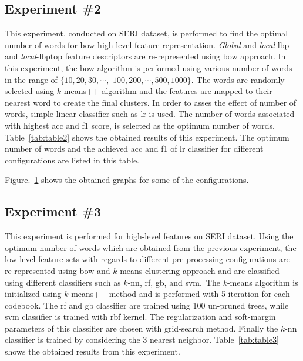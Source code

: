 \subsection{Experiment \#2}
This experiment, conducted on SERI dataset, is performed to find the optimal number of words for \ac{bow} high-level feature representation.
\emph{Global} and \emph{local}-\ac{lbp} and \emph{local}-\ac{lbptop} feature descriptors are re-represented using \ac{bow} approach.
In this experiment, the \ac{bow} algorithm is performed using various number of words in the range of $\{10, 20, 30, \cdots,$
 $100, 200, \cdots, 500, 1000\}$.
The words are randomly selected using $k$-means++ algorithm and the features are mapped to their nearest word to create the final clusters.
In order to asses the effect of number of words, simple linear classifier such as \ac{lr} is used.
The number of words associated with highest \ac{acc} and \ac{f1} score, is selected as the optimum number of words.
Table~\ref{tab:table2} shows the obtained results of this experiment.
The optimum number of words and the achieved \ac{acc} and \ac{f1} of \ac{lr} classifier for different configurations are listed in this table.




Figure.~\ref{fig:RBOW} shows the obtained graphs for some of the configurations. \\

\begin{figure}[t]
  \caption{}
  \label{fig:RBOW}
\end{figure}
 
\subsection{Experiment \#3}\label{subsec:exp3}
This experiment is performed for high-level features on SERI dataset. 
Using the optimum number of words which are obtained from the previous experiment, the low-level feature sets with regards to different pre-processing configurations are re-represented using \ac{bow} and $k$-means clustering approach and are classified using different classifiers such as $k$-\ac{nn}, \ac{rf}, \ac{gb}, and \ac{svm}.\
The $k$-means algorithm is initialized using $k$-means++ method and is performed with 5 iteration for each codebook.
The \ac{rf} and \ac{gb} classifier are trained using 100 un-pruned trees, while \ac{svm} classifier is trained with \ac{rbf} kernel. 
The regularization and soft-margin parameters of this classifier are chosen with grid-search method.
Finally the $k$-\ac{nn} classifier is trained by considering the 3 nearest neighbor.
Table~\ref{tab:table3} shows the obtained results from this experiment.\\

